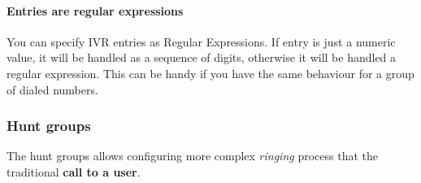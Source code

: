 \documentclass[letterpaper,10pt,spanish]{sphinxmanual}
\begin{document}
\paragraph{Entries are regular expressions}

You can specify IVR entries as Regular Expressions. If entry is just
a numeric value, it will be handled as a sequence of digits, otherwise it
will be handled a regular expression. This can be handy if you have the
same behaviour for a group of dialed numbers.


\subsubsection{Hunt groups}
\label{administration_portal/client/vpbx/routing_endpoints/hunt_groups:hunt-groups}\label{administration_portal/client/vpbx/routing_endpoints/hunt_groups::doc}\label{administration_portal/client/vpbx/routing_endpoints/hunt_groups:huntgroups}
The hunt groups allows configuring more complex \emph{ringing} process that the
traditional \textbf{call to a user}.
\end{document}

